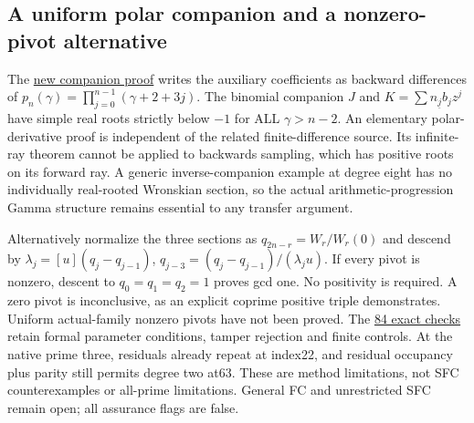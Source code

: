 \documentclass[11pt]{article}
\begin{document}
\subsection*{A uniform polar companion and a nonzero-pivot alternative}
The \href{GAP_THREE_POLAR_AND_CONTINUANT.tex}{new companion proof}
writes the auxiliary coefficients as backward differences of
$p_n(\gamma)=\prod_{j=0}^{n-1}(\gamma+2+3j)$.
The binomial companion $J$ and $K=\sum n_{\underline j}b_jz^j$ have
simple real roots strictly below $-1$ for ALL $\gamma>n-2$.
An elementary polar-derivative proof is independent of the related
finite-difference source. Its infinite-ray theorem cannot be applied
to backwards sampling, which has positive roots on its forward ray.
A generic inverse-companion example at degree eight has no individually
real-rooted Wronskian section, so the actual arithmetic-progression
Gamma structure remains essential to any transfer argument.

Alternatively normalize the three sections as $q_{2n-r}=W_r/W_r(0)$
and descend by
$\lambda_j=[u](q_j-q_{j-1})$,
$q_{j-3}=(q_j-q_{j-1})/(\lambda_ju)$.
If every pivot is nonzero, descent to $q_0=q_1=q_2=1$ proves gcd one.
No positivity is required. A zero pivot is inconclusive, as an explicit
coprime positive triple demonstrates. Uniform actual-family nonzero
pivots have not been proved. The
\href{gap_three_polar_continuant_verification.json}{84 exact checks}
retain formal parameter conditions, tamper rejection and finite controls.
At the native prime three, residuals already repeat at index22, and
residual occupancy plus parity still permits degree two at63. These are
method limitations, not SFC counterexamples or all-prime limitations.
General FC and unrestricted SFC remain open; all assurance flags are false.
\end{document}

